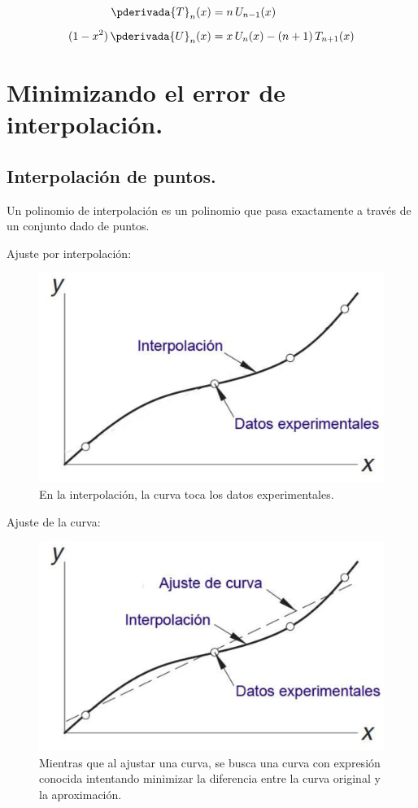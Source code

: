 \begin{align*}
\pderivada{T}_{n} (x) &= n \, U_{n-1} (x) \\[0.5em]
(1 - x^{2}) \, \pderivada{U}_{n} (x) &= x \, U_{n} (x) - (n + 1) \, T_{n+1} (x)
\end{align*}

\section{Minimizando el error de interpolación.}

\subsection{Interpolación de puntos.}

Un polinomio de interpolación es un polinomio que pasa exactamente a través de un conjunto dado de puntos.
\par
Ajuste por interpolación:
\begin{figure}[H]
   \centering
   \includegraphics[scale=0.5]{Imagenes/Interpol02.eps}
   \caption{En la interpolación, la curva toca los datos experimentales.}
\end{figure}

Ajuste de la curva:
\begin{figure}[H]
   \centering
   \includegraphics[scale=0.5]{Imagenes/Interpol03.eps}
   \caption{Mientras que al ajustar una curva, se busca una curva con expresión conocida intentando minimizar la diferencia entre la curva original y la aproximación.}
\end{figure}

